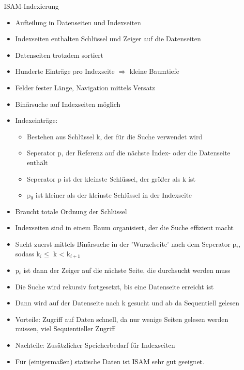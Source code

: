 \documentclass{article}
\begin{document}
\begin{block}{ISAM-Indexierung}
  \begin{itemize}
    \item Aufteilung in Datenseiten und Indexseiten
    \item Indexseiten enthalten Schlüssel und Zeiger auf die Datenseiten
    \item Datenseiten trotzdem sortiert
    \item Hunderte Einträge pro Indexseite $\Rightarrow$ kleine Baumtiefe
    \item Felder fester Länge, Navigation mittels Versatz
    \item Binärsuche auf Indexseiten möglich
    \item Indexeinträge:
    \begin{itemize}
      \item Bestehen aus Schlüssel k, der für die Suche verwendet wird
      \item Seperator p, der Referenz auf die nächste Index- oder die Datenseite enthält
      \item Seperator p ist der kleinste Schlüssel, der größer als k ist
      \item p$_0$ ist kleiner als der kleinste Schlüssel in der Indexseite
    \end{itemize}
    \item Braucht totale Ordnung der Schlüssel
    \item Indexseiten sind in einem Baum organisiert, der die Suche effizient macht
    \item Sucht zuerst mittels Binärsuche in der 'Wurzelseite' nach dem Seperator p$_i$, sodass k$_i \leq$ k < k$_{i+1}$
    \item p$_i$ ist dann der Zeiger auf die nächste Seite, die durchsucht werden muss
    \item Die Suche wird rekursiv fortgesetzt, bis eine Datenseite erreicht ist
    \item Dann wird auf der Datenseite nach k gesucht und ab da Sequentiell gelesen
    \item Vorteile: Zugriff auf Daten schnell, da nur wenige Seiten gelesen werden müssen, viel Sequientieller Zugriff
    \item Nachteile: Zusätzlicher Speicherbedarf für Indexseiten
    \item Für (einigermaßen) statische Daten ist ISAM sehr gut geeignet.
  \end{itemize}
\end{block}
\end{document}
